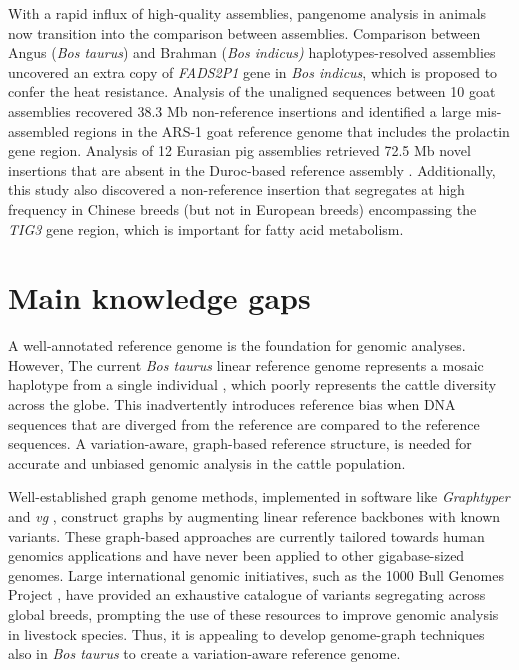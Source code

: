 \documentclass[../main.tex]{subfiles}
\begin{document}
With a rapid influx of high-quality assemblies, pangenome analysis in animals now transition into the comparison between assemblies. Comparison between Angus (\emph{Bos taurus}) and Brahman (\emph{Bos indicus)} haplotypes-resolved assemblies \citep{Low2020} uncovered an extra copy of \emph{FADS2P1} gene in \emph{Bos indicus}, which is proposed to confer the heat resistance. Analysis of the unaligned sequences between 10 goat assemblies \citep{li2019towards} recovered 38.3 Mb non-reference insertions and identified a large mis-assembled regions in the ARS-1 goat reference genome that includes the prolactin gene region. Analysis of 12 Eurasian pig assemblies retrieved 72.5 Mb novel insertions that are absent in the Duroc-based reference assembly \citep{li2017comprehensive,tian2019building}. Additionally, this study also discovered a non-reference insertion that segregates at high frequency in Chinese breeds (but not in European breeds) encompassing the \emph{TIG3} gene region, which is important for fatty acid metabolism. 


\section{Main knowledge gaps}

A well-annotated reference genome is the foundation for genomic analyses. However, The current \emph{Bos taurus} linear reference genome represents a mosaic haplotype  from a single individual \citep{rosen2020novo}, which poorly represents the cattle diversity across the globe. This inadvertently introduces reference bias when DNA sequences that are diverged from the reference are compared to the reference sequences. A variation-aware, graph-based reference structure, is needed for accurate and unbiased genomic analysis in the cattle population. 

Well-established graph genome methods, implemented in software like \emph{Graphtyper} \citep{eggertsson2017graphtyper} and \emph{vg} \citep{garrison2018variation}, construct graphs by augmenting linear reference backbones with known variants. These graph-based approaches are currently tailored towards human genomics applications and have never been applied  to other gigabase-sized genomes. Large international genomic initiatives, such as the 1000 Bull Genomes Project \citep{hayes20191000}, have provided an exhaustive catalogue of variants segregating across global breeds, prompting the use of these resources to improve genomic analysis in livestock species. Thus, it is appealing to develop genome-graph techniques also in \emph{Bos taurus} to create a variation-aware reference genome. 
\end{document}
